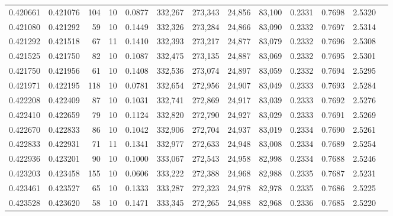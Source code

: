 \begin{tabular}{rrrrrrrrrrrrr}
0.420661 & 0.421076 &   104 &  10 &                                     0.0877 & 332,267 & 273,343 &  24,856 &  83,100 & 0.2331 & 0.7698 & 2.5320 \\
0.421080 & 0.421292 &    59 &  10 &                                     0.1449 & 332,326 & 273,284 &  24,866 &  83,090 & 0.2332 & 0.7697 & 2.5314 \\
0.421292 & 0.421518 &    67 &  11 &                                     0.1410 & 332,393 & 273,217 &  24,877 &  83,079 & 0.2332 & 0.7696 & 2.5308 \\
0.421525 & 0.421750 &    82 &  10 &                                     0.1087 & 332,475 & 273,135 &  24,887 &  83,069 & 0.2332 & 0.7695 & 2.5301 \\
0.421750 & 0.421956 &    61 &  10 &                                     0.1408 & 332,536 & 273,074 &  24,897 &  83,059 & 0.2332 & 0.7694 & 2.5295 \\
0.421971 & 0.422195 &   118 &  10 &                                     0.0781 & 332,654 & 272,956 &  24,907 &  83,049 & 0.2333 & 0.7693 & 2.5284 \\
0.422208 & 0.422409 &    87 &  10 &                                     0.1031 & 332,741 & 272,869 &  24,917 &  83,039 & 0.2333 & 0.7692 & 2.5276 \\
0.422410 & 0.422659 &    79 &  10 &                                     0.1124 & 332,820 & 272,790 &  24,927 &  83,029 & 0.2333 & 0.7691 & 2.5269 \\
0.422670 & 0.422833 &    86 &  10 &                                     0.1042 & 332,906 & 272,704 &  24,937 &  83,019 & 0.2334 & 0.7690 & 2.5261 \\
0.422833 & 0.422931 &    71 &  11 &                                     0.1341 & 332,977 & 272,633 &  24,948 &  83,008 & 0.2334 & 0.7689 & 2.5254 \\
0.422936 & 0.423201 &    90 &  10 &                                     0.1000 & 333,067 & 272,543 &  24,958 &  82,998 & 0.2334 & 0.7688 & 2.5246 \\
0.423203 & 0.423458 &   155 &  10 &                                     0.0606 & 333,222 & 272,388 &  24,968 &  82,988 & 0.2335 & 0.7687 & 2.5231 \\
0.423461 & 0.423527 &    65 &  10 &                                     0.1333 & 333,287 & 272,323 &  24,978 &  82,978 & 0.2335 & 0.7686 & 2.5225 \\
0.423528 & 0.423620 &    58 &  10 &                                     0.1471 & 333,345 & 272,265 &  24,988 &  82,968 & 0.2336 & 0.7685 & 2.5220 \\

\end{tabular}
